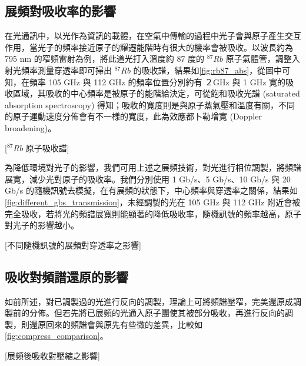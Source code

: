 \documentclass[class=NCU_thesis, crop=false]{standalone}
\begin{document}
\subsection{展頻對吸收率的影響}
\label{section:simulation_absorption}
在光通訊中，以光作為資訊的載體，在空氣中傳輸的過程中光子會與原子產生交互作用，當光子的頻率接近原子的耀遷能階時有很大的機率會被吸收。以波長約為 795  nm 的窄頻雷射為例，將此道光打入溫度約 87 度的 $^{87}Rb$ 原子氣體管，調整入射光頻率測量穿透率即可掃出 $^{87}Rb$ 的吸收譜，結果如\cref{fig:rb87_abs}，從圖中可知，在頻率 105 GHz 與 112 GHz 的頻率位置分別約有 ２GHz 與 1 GHz 寬的吸收區域，其吸收的中心頻率是被原子的能階給決定，可從飽和吸收光譜 (saturated absorption spectroscopy) 得知；吸收的寬度則是與原子蒸氣壓和溫度有關，不同的原子運動速度分佈會有不一樣的寬度，此為效應都卜勒增寬 (Doppler broadening)。

[$^{87}Rb$ 原子吸收譜]

為降低環境對光子的影響，我們可用上述之展頻技術，對光進行相位調製，將頻譜展寬，減少光對原子的吸收率。我們分別使用 1 Gb/s、5 Gb/s、10 Gb/s 與 20 Gb/s 的隨機訊號去模擬，在有展頻的狀態下，中心頻率與穿透率之關係，結果如\cref{fig:different_gbs_transmission}，未經調製的光在 105 GHz 與 112 GHz 附近會被完全吸收，若將光的頻譜展寬則能顯著的降低吸收率，隨機訊號的頻率越高，原子對光子的影響越小。

[不同隨機訊號的展頻對穿透率之影響]

\subsection{吸收對頻譜還原的影響}
如前所述，對已調製過的光進行反向的調製，理論上可將頻譜壓窄，完美還原成調製前的分佈。但若先將已展頻的光通入原子團使其被部分吸收，再進行反向的調製，則還原回來的頻譜會與原先有些微的差異，比較如\cref{fig:compress_comparison}。

[展頻後吸收對壓縮之影響]
\end{document}
